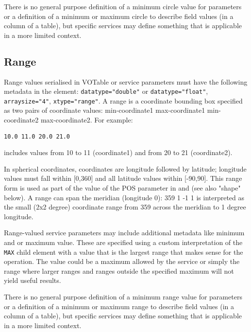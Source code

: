 \documentclass[11pt,letter]{ivoa}
\begin{document}
There is no general purpose definition of a minimum circle value for parameters or
a definition of a minimum or maximum circle to describe field values (in a column
of a table), but specific services may define something that is applicable in a
more limited context.

\subsection{Range}
Range values serialised in VOTable or service parameters must have the following
metadata in the  element: \verb|datatype="double"| or \verb|datatype="float"|,
\verb|arraysize="4"|, \verb|xtype="range"|. A range is a coordinate bounding box specified
as two pairs of coordinate values: min-coordinate1 max-coordinate1 min-coordinate2 max-coordinate2.
For example:

\begin{verbatim}
10.0 11.0 20.0 21.0
\end{verbatim}

includes values from 10 to 11 (coordinate1) and from 20 to 21 (coordinate2).

In spherical coordinates, coordinates are longitude followed by latitude; longitude values must
fall within [0,360] and all latitude values within [-90,90]. This range form is used as part of
the value of the POS parameter in \citep{2015ivoa.spec.1223D} and \citep{2017ivoa.spec.0517B}
(see also "shape" below). A range can span the meridian (longitude 0): 359 1 -1 1 is interpreted
as the small (2x2 degree) coordinate range from 359 across the meridian to 1 degree longitude.

Range-valued service parameters may include additional metadata like minimum and
or maximum value. These are specified using a custom interpretation of the
\verb|MAX| child element with a value that is the largest range that makes sense
for the operation. The value could be a maximum allowed by the service or simply
the range where larger ranges and ranges outside the specified maximum will not yield
useful results.

There is no general purpose definition of a minimum range value for parameters or
a definition of a minimum or maximum range to describe field values (in a column
of a table), but specific services may define something that is applicable in a
more limited context.
\end{document}

